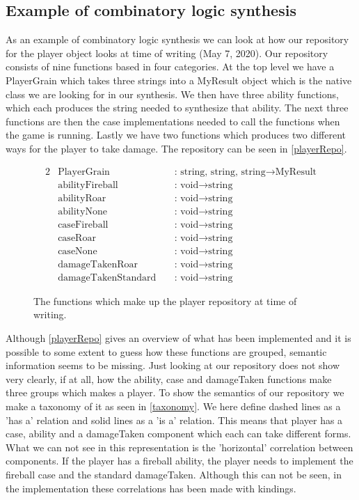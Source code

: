 \subsection{Example of combinatory logic synthesis}
As an example of combinatory logic synthesis we can look at how our repository for the player object looks at time of writing (May 7, 2020). Our repository consists of nine functions based in four categories. At the top level we have a PlayerGrain which takes three strings into a MyResult object which is the native class we are looking for in our synthesis. We then have three ability functions, which each produces the string needed to synthesize that ability. The next three functions are then the case implementations needed to call the functions when the game is running. Lastly we have two functions which produces two different ways for the player to take damage. The repository can be seen in \autoref{playerRepo}.
\begin{figure}[H]
	\centering
	\begin{alignat*}{2}
	&\text{PlayerGrain}\; &&\text{: string, string, string} \to \text{MyResult}\\
	&\text{abilityFireball}\; &&\text{: void} \to \text{string}\\
	&\text{abilityRoar}\; &&\text{: void} \to \text{string}\\
	&\text{abilityNone}\; &&\text{: void} \to \text{string}\\
	&\text{caseFireball}\; &&\text{: void} \to \text{string}\\
	&\text{caseRoar}\; &&\text{: void} \to \text{string}\\
	&\text{caseNone}\; &&\text{: void} \to \text{string}\\
	&\text{damageTakenRoar}\; &&\text{: void} \to \text{string}\\
	&\text{damageTakenStandard}\; &&\text{: void} \to \text{string}
	\end{alignat*}
	\caption{The functions which make up the player repository at time of writing.}
	\label{playerRepo}
\end{figure}

Although \autoref{playerRepo} gives an overview of what has been implemented and it is possible to some extent to guess how these functions are grouped, semantic information seems to be missing. Just looking at our repository does not show very clearly, if at all, how the ability, case and damageTaken functions make three groups which makes a player. To show the semantics of our repository we make a taxonomy of it as seen in \autoref{taxonomy}. We here define dashed lines as a 'has a' relation and solid lines as a 'is a' relation. This means that player has a case, ability and a damageTaken component which each can take different forms. What we can not see in this representation is the 'horizontal' correlation between components. If the player has a fireball ability, the player needs to implement the fireball case and the standard damageTaken. Although this can not be seen, in the implementation these correlations has been made with kindings.


